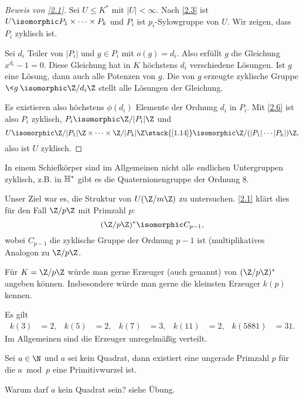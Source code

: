 \begin{proof}[Beweis von \ref{2.1}]
	Sei $U \le K^*$ mit $|U| < \infty$.
	Nach \ref{2.3} ist $U \isomorphic P_1 \times \dotsb \times P_k$ und $P_i$ ist $p_i$-Sylowgruppe von $U$.
	Wir zeigen, dass $P_i$ zyklisch ist.

	Sei $d_i$ Teiler von $|P_i|$ und $g \in P_i$ mit $o(g) = d_i$.
	Also erfüllt $g$ die Gleichung $x^{d_i} - 1 = 0$.
	Diese Gleichung hat in $K$ höchstens $d_i$ verschiedene Lösungen.
	Ist $g$ eine Lösung, dann auch alle Potenzen von $g$.
	Die von $g$ erzeugte zyklische Gruppe $\<g\> \isomorphic \Z / d_i \Z$ stellt alle Lösungen der Gleichung.

	Es existieren also höchstens $\phi(d_i)$ Elemente der Ordnung $d_i$ in $P_i$.
	Mit \ref{2.6} ist also $P_i$ zyklisch, $P_i \isomorphic \Z / |P_i| \Z$ und
	\[
		U \isomorphic
		\Z / |P_1| \Z \times \dotsb \times \Z / |P_k| \Z
		\stack{\ref{1.14}}\isomorphic
		\Z / (|P_1| \dotsb |P_k|) \Z,
	\]
	also ist $U$ zyklisch.
\end{proof}
\begin{note}
	In einem Schiefkörper sind im Allgemeinen nicht alle endlichen Untergruppen zyklisch, z.B. in $\mathbb{H}^*$ gibt es die Quaternionengruppe der Ordnung $8$.
\end{note}

Unser Ziel war es, die Struktur von $U(\Z / m \Z)$ zu untersuchen.
\ref{2.1} klärt dies für den Fall $\Z / p\Z$ mit Primzahl $p$:
\[
	(\Z / p \Z)^* \isomorphic C_{p-1},
\]
wobei $C_{p-1}$ die zyklische Gruppe der Ordnung $p-1$ ist (multiplikatives Analogon zu $\Z / p \Z$.

\begin{nt*}
	Für $K = \Z / p\Z$ würde man gerne Erzeuger (auch  genannt) von $(\Z / p\Z)^*$ angeben können.
	Insbesondere würde man gerne die kleinsten Erzeuger $k(p)$ kennen.
\end{nt*}

\begin{ex*}
	Es gilt
	\begin{align*}
		k(3) &= 2, &
		k(5) &= 2, &
		k(7) &= 3, &
		k(11) &= 2, &
		k(5881) &= 31.
	\end{align*}
	Im Allgemeinen sind die Erzeuger unregelmäßig verteilt.
\end{ex*}

\begin{conj*}[E. Artin]
	Sei $a \in \N$ und $a$ sei kein Quadrat, dann existiert eine ungerade Primzahl $p$ für die $a \bmod p$ eine Primitivwurzel ist.
	\begin{note}
		Warum darf $a$ kein Quadrat sein?
		siehe Übung.
	\end{note}
\end{conj*}

